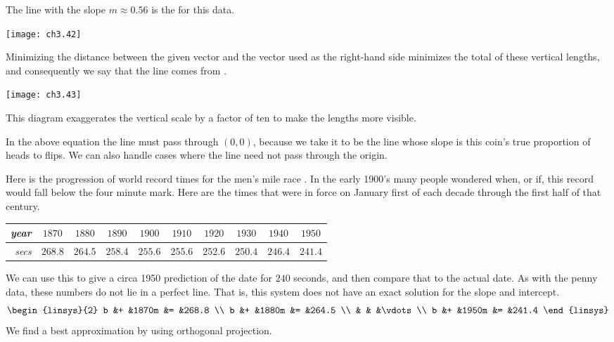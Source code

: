 The line with the slope \( m\approx 0.56 \)
is the %
for this data.
\begin{center}  \small
  \texttt{[image: ch3.42]}
\end{center}
Minimizing the distance
between the given vector and the vector used as the right-hand side
minimizes the total of these vertical lengths,
and consequently
we say that the line comes from
.
\begin{center}  \small
  \texttt{[image: ch3.43]}
\end{center}
This diagram exaggerates the vertical scale by a factor of ten
to make the lengths more visible.

In the above equation the line 
must pass through \( (0,0) \),
because we take it to be
the line whose slope is this coin's true proportion
of heads to flips. 
We can also handle cases where the line need not
pass through the origin.

Here is
the progression of world record times for the men's mile race \cite{Oakley}.
In the early 1900's many people wondered when, or if, 
this record would fall below the four minute mark.
Here are the times that were in force on January first
of each decade through the first half of that century.
\begin{center} \small
  \begin{tabular}{r|ccccccccc}
    \textit{year} &$1870$ &$1880$ &$1890$  &$1900$  
        &$1910$  &$1920$  &$1930$ &$1940$ &$1950$   \\
    \hline
    \textit{secs}  &$268.8$  &$264.5$  &$258.4$  &$255.6$  
        &$255.6$  &$252.6$  &$250.4$ &$246.4$ &$241.4$
  \end{tabular}  
\end{center}
We can use this to give a circa 1950 prediction of the date for $240$ seconds, 
and then compare that to the actual date.
As with the penny data, these numbers do not lie in a perfect line.
That is, this system does not have an exact solution for the slope
and intercept.
\begin{equation*}
  \begin{linsys}{2}
    b &+  &1870m  &=  &268.8 \\ 
    b &+  &1880m  &=  &264.5 \\ 
      &   &       &\vdots     \\
    b &+  &1950m  &=  &241.4  
  \end{linsys}
\end{equation*}
We find a best approximation by using orthogonal projection.

